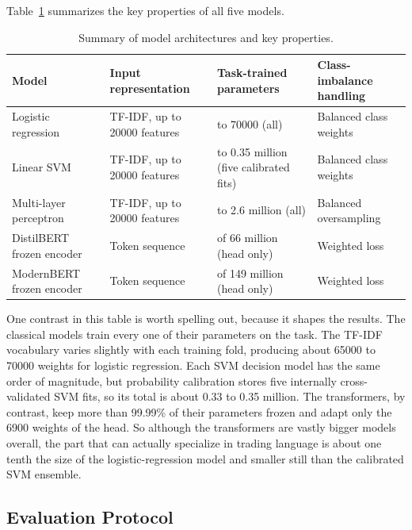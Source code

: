 Table~\ref{tab:model_summary} summarizes the key properties of all five models.

\begin{table}[H]
\centering
\caption{Summary of model architectures and key properties.}
\label{tab:model_summary}
\small
\setlength{\tabcolsep}{4pt}
\begin{tabularx}{\textwidth}{@{}>{\raggedright\arraybackslash}p{3.6cm}>{\raggedright\arraybackslash}X>{\raggedright\arraybackslash}X>{\raggedright\arraybackslash}X@{}}
\toprule
\textbf{Model} & \textbf{Input representation} & \textbf{Task-trained parameters} & \textbf{Class-imbalance handling} \\
\midrule
Logistic regression & TF-IDF, up to 20000 features & 65000 to 70000 (all) & Balanced class weights \\
Linear SVM & TF-IDF, up to 20000 features & 0.33 to 0.35 million (five calibrated fits) & Balanced class weights \\
Multi-layer perceptron & TF-IDF, up to 20000 features & 2.4 to 2.6 million (all) & Balanced oversampling \\
DistilBERT frozen encoder & Token sequence & 6900 of 66 million (head only) & Weighted loss \\
ModernBERT frozen encoder & Token sequence & 6900 of 149 million (head only) & Weighted loss \\
\bottomrule
\end{tabularx}
\end{table}

One contrast in this table is worth spelling out, because it shapes the results. The classical models train every one of their parameters on the task. The TF-IDF vocabulary varies slightly with each training fold, producing about 65000 to 70000 weights for logistic regression. Each SVM decision model has the same order of magnitude, but probability calibration stores five internally cross-validated SVM fits, so its total is about 0.33 to 0.35 million. The transformers, by contrast, keep more than 99.99\% of their parameters frozen and adapt only the 6900 weights of the head. So although the transformers are vastly bigger models overall, the part that can actually specialize in trading language is about one tenth the size of the logistic-regression model and smaller still than the calibrated SVM ensemble.

\subsection{Evaluation Protocol}
\label{sec:evaluation}

